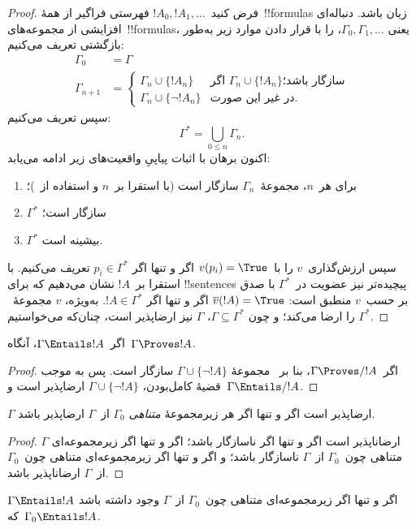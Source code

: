 \documentclass[../../../include/open-logic-section]{subfiles}
\begin{document}
\begin{proof}
فرض کنید~$!A_0,!A_1,\dots$ فهرستی فراگیر از همهٔ~!!{formula}s زبان
باشد. دنباله‌ای افزایشی از مجموعه‌های~!!{formula}s، یعنی
$\Gamma_0,\Gamma_1,\dots$، را با قرار دادن موارد زیر به‌طور بازگشتی
تعریف می‌کنیم:
\begin{align*}
\Gamma_0 & = \Gamma\\
\Gamma_{n+1} &  =
\begin{cases}
  \Gamma_n \cup \{!A_n\} & \text{اگر $\Gamma_n\cup\{!A_n\}$
    سازگار باشد؛}\\
  \Gamma_n \cup \{\lnot !A_n\} & \text{در غیر این صورت.}
\end{cases}
\end{align*}
سپس تعریف می‌کنیم:
\[
\Gamma^*=\bigcup_{0\le n}\Gamma_n.
\]
اکنون برهان با اثبات پیاپیِ واقعیت‌های زیر ادامه می‌یابد:
\begin{enumerate}
\item برای هر~$n$، مجموعهٔ~$\Gamma_n$ سازگار است (با استقرا بر~$n$ و
  استفاده از~)؛
\item $\Gamma^*$ سازگار است؛
\item $\Gamma^*$ بیشینه است.
\end{enumerate}
سپس ارزش‌گذاری~$v$ را با~$v(p_i)=\True$ اگر و تنها اگر
$p_i\in\Gamma^*$ تعریف می‌کنیم. با استقرا بر~$!A$ نشان می‌دهیم که برای
!!{sentence}s پیچیده‌تر نیز عضویت در~$\Gamma^*$ با صدق بر حسب~$v$
منطبق است: $\overline{v}(!A)=\True$ اگر و تنها اگر
$!A\in\Gamma^*$. به‌ویژه، $v$ مجموعهٔ~$\Gamma^*$ را ارضا می‌کند؛ و چون
$\Gamma\subseteq\Gamma^*$، $\Gamma$ نیز ارضاپذیر است، چنان‌که می‌خواستیم.
\end{proof}

\begin{cor}
اگر~$\Gamma\Entails !A$، آنگاه~$\Gamma\Proves !A$.
\end{cor}

\begin{proof}
اگر~$\Gamma\Proves/ !A$، بنا بر~ مجموعهٔ
$\Gamma\cup\{\lnot !A\}$ سازگار است. پس به موجب قضیهٔ کامل‌بودن،
$\Gamma\cup\{\lnot !A\}$ ارضاپذیر است و~$\Gamma\Entails/ !A$.
\end{proof}

\begin{prop}
$\Gamma$ ارضاپذیر است اگر و تنها اگر هر زیرمجموعهٔ \emph{متناهی}
$\Gamma_0$ از~$\Gamma$ ارضاپذیر باشد.
\end{prop}

\begin{proof}
$\Gamma$ ارضاناپذیر است اگر و تنها اگر ناسازگار باشد؛ اگر و تنها اگر
زیرمجموعه‌ای متناهی چون~$\Gamma_0$ از~$\Gamma$ ناسازگار باشد؛ و اگر و
تنها اگر زیرمجموعه‌ای متناهی چون~$\Gamma_0$ از~$\Gamma$ ارضاناپذیر باشد.
\end{proof}

\begin{cor}
$\Gamma\Entails !A$ اگر و تنها اگر زیرمجموعه‌ای متناهی چون~$\Gamma_0$
از~$\Gamma$ وجود داشته باشد که~$\Gamma_0\Entails !A$.
\end{cor}
\end{document}
